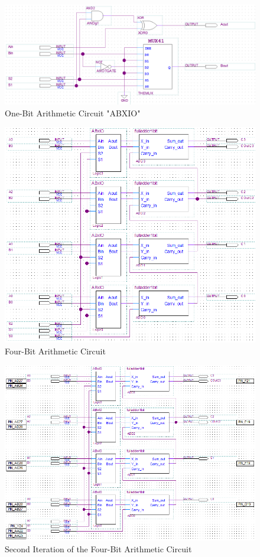 \documentclass[a4paper,12pt]{article}
\begin{document}
\begin{figure}[H]
\includegraphics[width=\textwidth]{Diagrams/BlockDiagram_ABXIO.PNG} 
\caption{One-Bit Arithmetic Circuit "ABXIO"}
\label{fig:ABXIO}
\end{figure}

\begin{figure}[H]
\includegraphics[width=\textwidth]{Diagrams/BlockDiagram_AC.PNG} 
\caption{Four-Bit Arithmetic Circuit}
\label{fig:AC}
\end{figure}

\begin{figure}[H]
\includegraphics[width=\textwidth]{Diagrams/BlockDiagram_AC_VER2.PNG} 
\caption{Second Iteration of the Four-Bit Arithmetic Circuit}

\label{fig:ACSecondIteration}
\end{figure}
\end{document}
